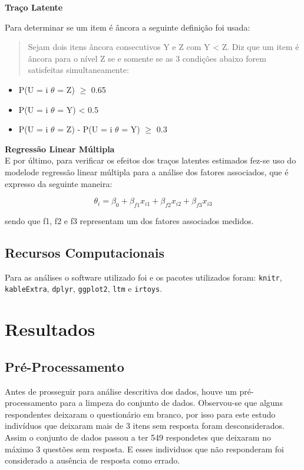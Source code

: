 \documentclass[]{article}
\providecommand{\tightlist}{%
  \setlength{\itemsep}{0pt}\setlength{\parskip}{0pt}}
\begin{document}
\textbf{Traço Latente}

Para determinar se um item é âncora a seguinte definição foi usada:

\begin{quote}
Sejam dois itens âncora consecutivos Y e Z com Y \textless{} Z. Diz que
um item é âncora para o nível Z se e somente se as 3 condições abaixo
forem satisfeitas simultaneamente:
\end{quote}

\begin{itemize}
\tightlist
\item
  P(U = i \textbar{} \(\theta\) = Z) \(\geq\) 0.65
\item
  P(U = i \textbar{} \(\theta\) = Y) \textless{} 0.5
\item
  P(U = i \textbar{} \(\theta\) = Z) - P(U = i \textbar{} \(\theta\) =
  Y) \(\geq\) 0.3
\end{itemize}

\textbf{Regressão Linear Múltipla}\\

E por último, para verificar os efeitos dos traços latentes estimados
fez-se uso do modelode regressão linear múltipla para a análise dos
fatores associados, que é expresso da seguinte maneira:

\[\theta_{i} = \beta_0 + \beta_{f1}x_{i1} + \beta_{f2}x_{i2} + \beta_{f3}
x_{i3}\]

sendo que f1, f2 e f3 representam um dos fatores associados medidos.

\subsection{Recursos Computacionais}\label{recursos-computacionais}

Para as análises o software utilizado foi \citet{software-r} e os
pacotes utilizados foram: \texttt{knitr}, \texttt{kableExtra},
\texttt{dplyr}, \texttt{ggplot2}, \texttt{ltm} e \texttt{irtoys}.

\section{Resultados}\label{resultados}

\subsection{Pré-Processamento}\label{pre-processamento}

Antes de prosseguir para análise descritiva dos dados, houve um
pré-processamento para a limpeza do conjunto de dados. Observou-se que
alguns respondentes deixaram o questionário em branco, por isso para
este estudo indivíduos que deixaram mais de 3 itens sem resposta foram
desconsiderados. Assim o conjunto de dados passou a ter 549 respondetes
que deixaram no máximo 3 questões sem resposta. E esses individuos que
não responderam foi considerado a ausência de resposta como errado.
\end{document}

